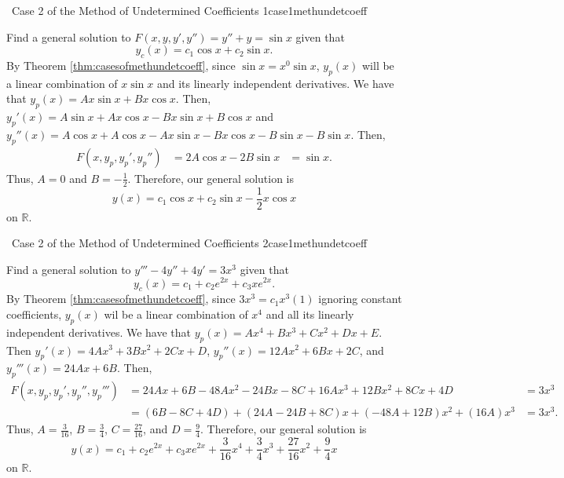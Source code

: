     \begin{example}{\Difficulty\,\Difficulty\,\,Case 2 of the Method of Undetermined Coefficients 1}{case1methundetcoeff}
        
        Find a general solution to \(F(x,y,y',y'')=y''+y=\sin x\) given that
        \begin{equation*}
            y_c(x)=c_1\cos x+c_2\sin x.
        \end{equation*}
        By Theorem \ref{thm:casesofmethundetcoeff}, since \(\sin x=x^0\sin x\), \(y_p(x)\) will be a linear combination of \(x\sin x\) and its linearly independent derivatives. We have that \(y_p(x)=Ax\sin x+Bx\cos x\). Then, \(y_p'(x)=A\sin x+Ax\cos x-Bx\sin x+B\cos x\) and \(y_p''(x)=A\cos x+A\cos x-Ax\sin x-Bx\cos x-B\sin x-B\sin x\). Then,
        \begin{align*}
            F(x,y_p,y_p',y_p'')&=2A\cos x-2B\sin x&=\sin x.
        \end{align*}
        Thus, \(A=0\) and \(B=-\frac{1}{2}\). Therefore, our general solution is
        \begin{equation*}
            y(x)=c_1\cos x+c_2\sin x-\frac{1}{2}x\cos x
        \end{equation*}
        on \(\mathbb{R}\).

    \end{example}
    \pagebreak
    \begin{example}{\Difficulty\,\Difficulty\,\,Case 2 of the Method of Undetermined Coefficients 2}{case1methundetcoeff}

        Find a general solution to \(y'''-4y''+4y'=3x^3\) given that
        \begin{equation*}
            y_c(x)=c_1+c_2e^{2x}+c_3xe^{2x}.
        \end{equation*}
        By Theorem \ref{thm:casesofmethundetcoeff}, since \(3x^3=c_1x^3(1)\) ignoring constant coefficients, \(y_p(x)\) wil be a linear combination of \(x^4\) and all its linearly independent derivatives. We have that \(y_p(x)=Ax^4+Bx^3+Cx^2+Dx+E\). Then \(y_p'(x)=4Ax^3+3Bx^2+2Cx+D\), \(y_p''(x)=12Ax^2+6Bx+2C\), and \(y_p'''(x)=24Ax+6B\). Then,
        \begin{align*}
            F(x,y_p,y_p',y_p'',y_p''')&=24Ax+6B-48Ax^2-24Bx-8C+16Ax^3+12Bx^2+8Cx+4D&=3x^3 \\
            &=(6B-8C+4D)+(24A-24B+8C)x+(-48A+12B)x^2+(16A)x^3&=3x^3.
        \end{align*}
        Thus, \(A=\frac{3}{16}\), \(B=\frac{3}{4}\), \(C=\frac{27}{16}\), and \(D=\frac{9}{4}\). Therefore, our general solution is
        \begin{equation*}
            y(x)=c_1+c_2e^{2x}+c_3xe^{2x}+\frac{3}{16}x^4+\frac{3}{4}x^3+\frac{27}{16}x^2+\frac{9}{4}x
        \end{equation*}
        on \(\mathbb{R}\).
        
    \end{example}

